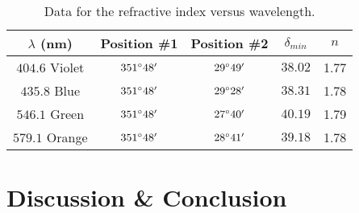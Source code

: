 \documentclass[10pt]{article}
\begin{document}
\begin{table}[ht]
    \centering
    \begin{tabular}{|c|c|c|c|c|}
        \hline
        $\lambda$ (nm) & Position \#1 & Position \#2 & $\delta_{min}$ & $n$ \\
        \hline
        $404.6$ Violet & $351\degree 48'$ & $29\degree 49'$ & $38.02$ & 1.77 \\
        \hline
        $435.8$ Blue & $351\degree 48'$ & $29\degree 28'$ & $38.31$ & 1.78 \\
        \hline
        $546.1$ Green & $351\degree 48'$ & $27\degree 40'$ & $40.19$ & 1.79 \\
        \hline
        $579.1$ Orange & $351\degree 48'$ & $28\degree 41'$ & $39.18$ & 1.78 \\
        \hline
    \end{tabular}
    \caption{Data for the refractive index versus wavelength.}
    \label{tab:2}
\end{table}

\section{Discussion \& Conclusion}

\printbibliography
\end{document}
